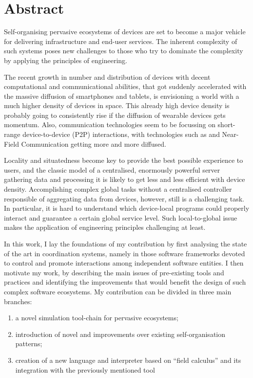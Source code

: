 \documentclass[12pt,a4paper,twoside,openright]{book}
\begin{document}
%
\frontmatter
\maketitle
\pagestyle{plain}

\tableofcontents

\chapter*{\centering Abstract}

Self-organising pervasive ecosystems of devices are set to become a major vehicle for delivering infrastructure and end-user services.
%
The inherent complexity of such systems poses new challenges to those who try to dominate the complexity by applying the principles of engineering.

The recent growth in number and distribution of devices with decent computational and communicational abilities, that got suddenly accelerated with the massive diffusion of smartphones and tablets, is envisioning a world with a much higher density of devices in space.
%
This already high device density is probably going to consistently rise if the diffusion of wearable devices gets momentum.
%
Also, communication technologies seem to be focussing on short-range device-to-device (P2P) interactions, with technologies such as \btle{} and Near-Field Communication getting more and more diffused.

Locality and situatedness become key to provide the best possible experience to users, and the classic model of a centralised, enormously powerful server gathering data and processing it is likely to get less and less efficient with device density.
%
Accomplishing complex global tasks without a centralised controller responsible of aggregating data from devices, however, still is a challenging task.
%
In particular, it is hard to understand which device-local programs could properly interact and guarantee a certain global service level.
%
Such local-to-global issue makes the application of engineering principles challenging at least.

In this work, I lay the foundations of my contribution by first analysing the state of the art in coordination systems, namely in those software frameworks devoted to control and promote interactions among independent software entities.
%
I then motivate my work, by describing the main issues of pre-existing tools and practices and identifying the improvements that would benefit the design of such complex software ecosystems.
%
My contribution can be divided in three main branches:
\begin{enumerate}
 \item a novel simulation tool-chain for pervasive ecosystems;
 \item introduction of novel and improvements over existing self-organisation patterns;
 \item creation of a new language and interpreter based on ``field calculus'' and its integration with the previously mentioned tool
\end{enumerate}
%
\end{document}
